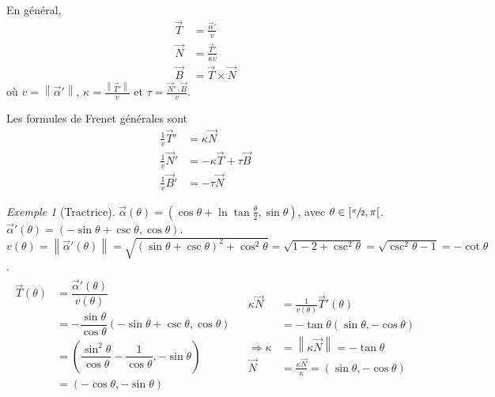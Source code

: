 \documentclass{report}
\theoremstyle{definition}
\theoremstyle{remark}
\newtheorem*{exem}{Exemple}
\newcommand*{\norme}[1]{\left\|#1\right\|}
\begin{document}
	En g\'en\'eral,
	\begin{align*}
		\vec T&= \frac{\vec\alpha'}{v}\\
		\vec N&= \frac{\vec T'}{\kappa v}\\
		\vec B&= \vec T \times \vec N
	\end{align*}
	o\`u $v=\norme{\vec\alpha'}$, $\kappa=\frac{\norme{\vec T'}}{v}$ et $\tau=\frac{\vec N'\cdot\vec B}{v}$.

	Les formules de Frenet g\'en\'erales sont
	\begin{align}
		\frac{1}{v}\vec T'&= \kappa\vec N\\
		\frac{1}{v}\vec N'&= -\kappa\vec T+\tau\vec B\\
		\frac{1}{v}\vec B'&= -\tau\vec N
	\end{align}

	\begin{exem}[Tractrice]
		$\vec\alpha(\theta) = \left( \cos\theta+\ln\tan\frac{\theta}{2}, \sin\theta \right)$, avec $\theta \in [\sfrac{\pi}{2}, \pi[$. $\vec\alpha'(\theta) = \left( -\sin\theta+\csc\theta, \cos\theta \right)$. $v(\theta) = \norme{\vec\alpha'(\theta)} = \sqrt{(\sin\theta+\csc\theta)^2+\cos^2\theta} = \sqrt{1-2+\csc^2\theta} = \sqrt{\csc^2\theta-1} = -\cot\theta$.
		\begin{align*}
			\begin{split}
				\vec T(\theta)&= \dfrac{\vec\alpha'(\theta)}{v(\theta)}\\
				&= -\dfrac{\sin\theta}{\cos\theta} \left( -\sin\theta+\csc\theta, \cos\theta \right)\\
				&= \left( \dfrac{\sin^2\theta}{\cos\theta}-\dfrac{1}{\cos\theta}, -\sin\theta \right)\\
				&= \left( -\cos\theta, -\sin\theta \right)
			\end{split}
			&
			\begin{split}
				\kappa\vec N&= \frac{1}{v(\theta)} \vec T'(\theta)\\
				&= -\tan\theta \left( \sin\theta, -\cos\theta \right)\\[.5em]
				\Rightarrow\kappa&= \norme{\kappa\vec N} = -\tan\theta\\
				\vec N&= \frac{\kappa\vec N}{\kappa} = \left( \sin\theta, -\cos\theta \right)
			\end{split}
		\end{align*}
	\end{exem}
\end{document}
